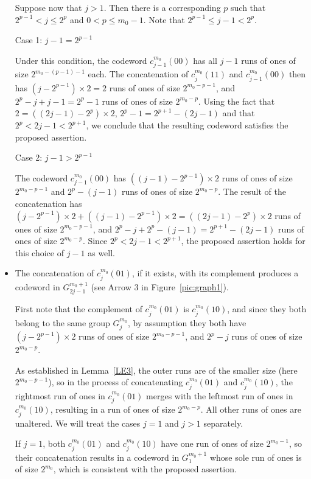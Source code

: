\begin{itemize}
Suppose now that $j>1$. Then there is a corresponding $p$ such
that $2^{p-1} < j \leq 2^p$ and $0 < p \leq m_0-1$. Note that
$2^{p-1} \leq j-1 < 2^p$.

Case 1: $j-1=2^{p-1}$

Under this condition, the codeword $c_{j-1}^{m_0}(00)$ has all
$j-1$ runs of ones of size $2^{m_0-(p-1)-1}$ each. The
concatenation of $c_j^{m_0}(11)$ and $c_{j-1}^{m_0}(00)$ then has
$(j-2^{p-1})\times 2=2$ runs of ones of size $2^{m_0-p-1}$, and
$2^p-j+j-1=2^p-1$ runs of ones of size $2^{m_0-p}$. Using the fact
that $2=((2j-1)-2^p)\times 2$, $2^p-1=2^{p+1}-(2j-1)$ and that
$2^p < 2j-1 <2^{p+1}$, we conclude that the resulting codeword
satisfies the proposed assertion.

Case 2: $j-1>2^{p-1}$

The codeword $c_{j-1}^{m_0}(00)$ has $((j-1)-2^{p-1})\times2$ runs
of ones of size $2^{m_0-p-1}$ and $2^p-(j-1)$ runs of ones of size
$2^{m_0-p}$. The result of the concatenation has
$(j-2^{p-1})\times 2+((j-1)-2^{p-1})\times2=((2j-1)-2^{p})\times2$
runs of ones of size $2^{m_0-p-1}$, and
$2^p-j+2^p-(j-1)=2^{p+1}-(2j-1)$ runs of ones of size $2^{m_0-p}$.
Since $2^p < 2j-1 <2^{p+1}$, the proposed assertion holds for this
choice of $j-1$ as well.



\item The concatenation of $c_j^{m_0}(01)$, if it exists, with its
complement produces a codeword in $G_{2j-1}^{m_0+1}$ (see Arrow 3
in Figure~\ref{pic:graph1}).

First note that the complement of $c_j^{m_0}(01)$ is
$c_j^{m_0}(10)$, and since they both belong to the same group
$G_j^{m_0}$, by assumption they both have $(j-2^{p-1})\times 2$
runs of ones of size $2^{m_0-p-1}$, and $2^p-j$ runs of ones of
size $2^{m_0-p}$.

As established in Lemma~\ref{LE3}, the outer runs are of the
smaller size (here $2^{m_0-p-1}$), so in the process of
concatenating $c_j^{m_0}(01)$ and $c_j^{m_0}(10)$, the rightmost
run of ones in $c_j^{m_0}(01)$ merges with the leftmost run of
ones in $c_j^{m_0}(10)$, resulting in a run of ones of size
$2^{m_0-p}$. All other runs of ones are unaltered. We will treat
the cases $j=1$ and $j>1$ separately.

If $j=1$, both $c_j^{m_0}(01)$ and $c_j^{m_0}(10)$ have one run of
ones of size $2^{m_0-1}$, so their concatenation results in a
codeword in $G_{1}^{m_0+1}$ whose sole run of ones is of size
$2^{m_0}$, which is consistent with the proposed assertion.


\end{itemize}
